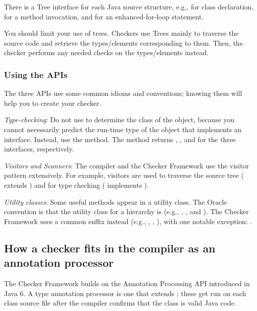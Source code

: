 There is a Tree interface for each Java source structure, e.g.,
 for class declaration, 
for a method invocation, and  for an enhanced-for-loop
statement.

You should limit your use of trees. Checkers use Trees mainly to
traverse the source code and retrieve the types/elements corresponding to
them.  Then, the checker performs any needed checks on the types/elements instead.


\subsubsection{Using the APIs}

The three APIs use some common idioms and conventions; knowing them will
help you to create your checker.

\emph{Type-checking}:
Do not use  to determine the class of the object,
because you cannot necessarily predict the run-time type of the object that
implements an interface.  Instead, use the  method.  The
method returns ,
, and 
for the three interfaces, respectively.

\emph{Visitors and Scanners}:
The compiler and the Checker Framework use the visitor pattern
extensively. For example, visitors are used to traverse the source tree
( extends
) and for type
checking ( implements
).

\emph{Utility classes}:
Some useful methods appear in a utility class.  The Oracle convention is that
the utility class for a  hierarchy is  (e.g.,
, , and
).  The Checker Framework uses a common
 suffix instead (e.g., ,
, ), with one
notable exception: .


\subsection{How a checker fits in the compiler as an annotation processor}

The Checker Framework builds on the Annotation Processing API
introduced in Java 6.  A type annotation processor is one that extends
; these get run on each class
source file after the compiler confirms that the class is valid Java code.

